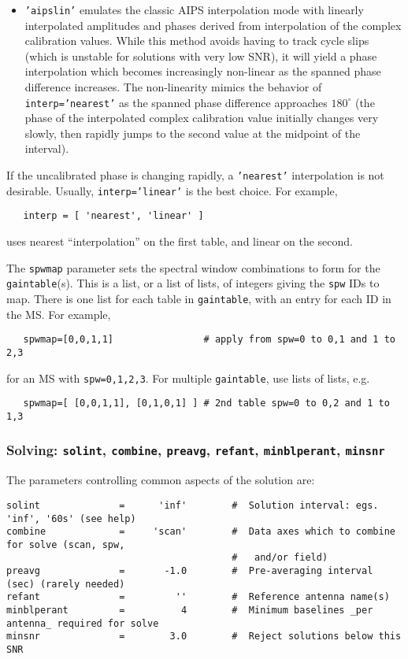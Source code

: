 {\begin{itemize}
\item {\tt 'aipslin'} emulates the classic AIPS interpolation mode with
   linearly interpolated amplitudes and phases derived from
   interpolation of the complex calibration values. While this method
   avoids having to track cycle slips (which is unstable for solutions
   with very low SNR), it will yield a phase interpolation which becomes
   increasingly non-linear as the spanned phase difference increases. The
   non-linearity mimics the behavior of {\tt interp='nearest'} as the spanned
   phase difference approaches $180^\circ$ (the phase of the interpolated
   complex calibration value initially changes very slowly, then rapidly
   jumps to the second value at the midpoint of the interval).
\end{itemize}

If the uncalibrated phase is changing rapidly, a {\tt 'nearest'}
interpolation is not desirable. Usually, {\tt interp='linear'} is the
best choice. For example,
\small
\begin{verbatim}
   interp = [ 'nearest', 'linear' ]
\end{verbatim}
\normalsize
uses nearest ``interpolation'' on the first table, and linear
on the second.

The {\tt spwmap} parameter sets the spectral window combinations to
form for the {\tt gaintable}(s).  This is a list, or a list of lists,
of integers giving the {\tt spw} IDs to map.  There is one list for
each table in {\tt gaintable}, with an entry for each ID in the MS.
For example,
\small
\begin{verbatim}
   spwmap=[0,0,1,1]                # apply from spw=0 to 0,1 and 1 to 2,3
\end{verbatim}
\normalsize
for an MS with {\tt spw=0,1,2,3}.  For multiple {\tt gaintable}, use
lists of lists, e.g.
\small
\begin{verbatim}
   spwmap=[ [0,0,1,1], [0,1,0,1] ] # 2nd table spw=0 to 0,2 and 1 to 1,3
\end{verbatim} 
\normalsize

\subsubsection{Solving: {\tt solint}, {\tt combine},
{\tt preavg}, {\tt refant}, {\tt minblperant}, {\tt minsnr} }
\label{section:cal.solve.pars.solving}

The parameters controlling common aspects of the solution are:
\small
\begin{verbatim}
solint              =      'inf'        #  Solution interval: egs. 'inf', '60s' (see help)
combine             =     'scan'        #  Data axes which to combine for solve (scan, spw,
                                        #   and/or field)
preavg              =       -1.0        #  Pre-averaging interval (sec) (rarely needed)
refant              =         ''        #  Reference antenna name(s)
minblperant         =          4        #  Minimum baselines _per antenna_ required for solve
minsnr              =        3.0        #  Reject solutions below this SNR
\end{verbatim} 
\normalsize

}
